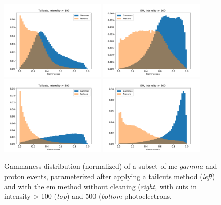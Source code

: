 \documentclass[main.tex]{subfiles}
\begin{document}
\begin{figure}
  \centering
  \includegraphics[width=0.45\textwidth]{Pictures/mc_gammaness_intensity100_likelihood10000000.pdf}
  \includegraphics[width=0.45\textwidth]{Pictures/em_mc_tailcuts_gammaness_intensity100.pdf}\\
  \includegraphics[width=0.45\textwidth]{Pictures/mc_gammaness_intensity500_likelihood10000000.pdf}
  \includegraphics[width=0.45\textwidth]{Pictures/em_mc_tailcuts_gammaness_intensity500.pdf}
  \caption{Gammaness distribution (normalized) of a subset of \gls{mc} $gamma$ and proton events, parameterized after applying a tailcuts method (\textit{left}) and with the \gls{em} method without cleaning (\textit{right}, with cuts in intensity > 100 (\textit{top}) and 500 (\textit{bottom} photoelectrons.}
  \label{fig:gammanessdist}
\end{figure}
\end{document}
